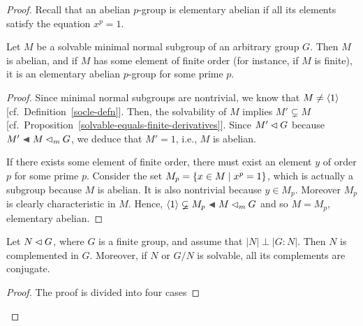\begin{proof}
\medskip
Recall that an abelian $p$-group is elementary abelian if all its elements satisfy the equation $x^p=1$.

\begin{lem}\label{solvable-minimal-normal}
    Let\/ $M$ be a solvable minimal normal subgroup of an arbitrary group\/ $G$. Then\/ $M$ is abelian, and if\/ $M$ has some element of finite order (for instance, if $M$ is finite), it is an elementary abelian\/ $p$-group for some prime\/ $p$.
\end{lem}

\begin{proof} Since minimal normal subgroups are nontrivial, we know that $M\ne\langle1\rangle$  [cf.~Definition~\ref{socle-defn}]. Then, the solvability of $M$ implies $M'\varsubsetneq M$ [cf.~Proposition~\ref{solvable-equals-finite-derivatives}]. Since $M'\lhd G$ because $M'\ch M\normal_m G$, we deduce that $M'=1$, i.e., $M$ is abelian.

If there exists some element of finite order, there must exist an element $y$ of order $p$ for some prime $p$. Consider the set $M_p=\{x\in M\mid x^p=1\}$, which is actually a subgroup because $M$ is abelian. It is also nontrivial because $y\in M_p$. Moreover $M_p$ is clearly characteristic in $M$. Hence, $\gen1\varsubsetneq M_p\ch M\normal_m G$ and so $M=M_p$, elementary abelian.  \end{proof}


\begin{thm}\label{schur-zassenhaus-thm}{}
    Let\/ $N\lhd G$, where\/ $G$ is a finite group, and assume that\/ $|N|\perp|G:N|$. Then\/ $N$ is complemented in\/ $G$. Moreover, if\/ $N$ or $G/N$ is solvable, all its complements are conjugate.
\end{thm}

\begin{proof} The proof is divided into four cases


\end{proof}
\end{proof}
